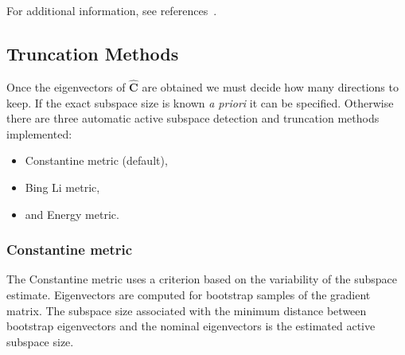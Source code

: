 For additional information, see references~\cite{Constantine-preprint-active,constantine2014active,constantine2015active}.

\subsection{Truncation Methods}\label{Sec:trunc}
Once the eigenvectors of $\hat{\mathbf{C}}$ are obtained we must decide how many
directions to keep. If the exact subspace size is known \textit{a priori} it can be
specified. Otherwise there are three automatic active subspace detection and
truncation methods implemented:
\begin{itemize}
\item Constantine metric (default),
\item Bing Li metric,
\item and Energy metric.
\end{itemize}

\subsubsection{Constantine metric}\label{SubSec:constantine}
The Constantine metric uses a criterion based on the variability of the subspace estimate. 
Eigenvectors are computed for bootstrap samples of the gradient matrix. The 
subspace size associated with the minimum distance between bootstrap 
eigenvectors and the nominal eigenvectors is the estimated active subspace
size.

